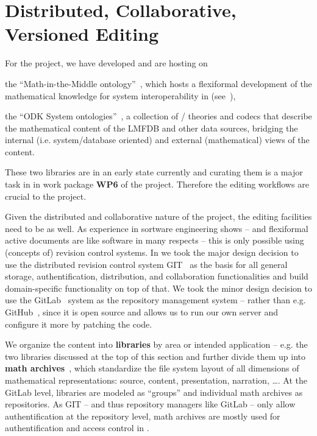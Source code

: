 \section{Distributed, Collaborative, Versioned Editing}\label{sec:editing}

For the \pn project, we have developed and are hosting on \sys
\begin{compactenum}
\item the ``Math-in-the-Middle ontology''~\cite{MitM:on}, which hosts a flexiformal
  development of the mathematical knowledge for system interoperability in \pn
  (see~\cite{DehKohKon:iop16,ODK-D6.2}),
\item the ``ODK System ontologies''~\cite{ODKsysonto:on}, a collection of \omdoc/\mmt
  theories and codecs that describe the mathematical content of the LMFDB and other data
  sources, bridging the internal (i.e. system/database oriented) and external
  (mathematical) views of the content.
\end{compactenum}
These two \sys libraries are in an early state currently and curating them is a major task
in in work package \textbf{WP6} of the \pn project. Therefore the editing workflows are
crucial to the project.

Given the distributed and collaborative nature of the \pn project, the editing facilities
need to be as well. As experience in sortware engineering shows -- and flexiformal active
documents are like software in many respects -- this is only possible using (concepts of)
revision control systems. In \sys we took the major design decision to use the distributed
revision control system GIT~\cite{GIT:on} as the basis for all general storage,
authentification, distribution, and collaboration functionalities and build
domain-specific functionality on top of that. We took the minor design decision to use the
GitLab~\cite{GitLab:on} system as the repository management system -- rather than e.g.
GitHub~\cite{GitHub:on}, since it is open source and allows us to run our own server and
configure it more by patching the code.

We organize the content into \textbf{libraries} by area or intended application --
e.g. the two libraries discussed at the top of this section and further divide them up
into \textbf{math archives}~\cite{HorIacJuc:cscpnrr11}, which standardize the file system
layout of all dimensions of mathematical representations: source, content, presentation,
narration, \ldots. At the GitLab level, libraries are modeled as ``groups'' and individual
math archives as repositories. As GIT -- and thus repository managers like GitLab -- only
allow authentification at the repository level, math archives are mostly used for
authentification and access control in \sys.

